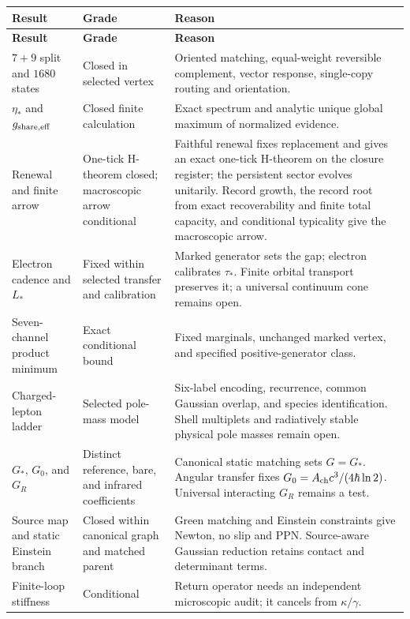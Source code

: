 \documentclass[11pt]{article}
\begin{document}
\begingroup
\setlength{\parskip}{0pt}
\small
\setlength{\tabcolsep}{4pt}
\renewcommand{\arraystretch}{1.13}
\begin{longtable}{L{0.24\textwidth}L{0.22\textwidth}L{0.47\textwidth}}
\toprule
\textbf{Result} & \textbf{Grade} & \textbf{Reason}\\
\midrule
\endfirsthead
\toprule
\textbf{Result} & \textbf{Grade} & \textbf{Reason}\\
\midrule
\endhead
\bottomrule
\endfoot
$7+9$ split and $1680$ states & Closed in selected vertex & Oriented matching, equal-weight reversible complement, vector response, single-copy routing and orientation.\\
$\eta_*$ and $g_{\rm share,eff}$ & Closed finite calculation & Exact spectrum and analytic unique global maximum of normalized evidence.\\
Renewal and finite arrow & One-tick H-theorem closed; macroscopic arrow conditional & Faithful renewal fixes replacement and gives an exact one-tick H-theorem on the closure register; the persistent sector evolves unitarily. Record growth, the record root from exact recoverability and finite total capacity, and conditional typicality give the macroscopic arrow.\\
Electron cadence and $L_*$ & Fixed within selected transfer and calibration & Marked generator sets the gap; electron calibrates $\tau_*$. Finite orbital transport preserves it; a universal continuum cone remains open.\\
Seven-channel product minimum & Exact conditional bound & Fixed marginals, unchanged marked vertex, and specified positive-generator class.\\
Charged-lepton ladder & Selected pole-mass model & Six-label encoding, recurrence, common Gaussian overlap, and species identification. Shell multiplets and radiatively stable physical pole masses remain open.\\
$G_*$, $G_0$, and $G_R$ & Distinct reference, bare, and infrared coefficients & Canonical static matching sets $G=G_*$. Angular transfer fixes $G_0=A_{\rm ch}c^3/(4\hbar\ln2)$. Universal interacting $G_R$ remains a test.\\
Source map and static Einstein branch & Closed within canonical graph and matched parent & Green matching and Einstein constraints give Newton, no slip and PPN. Source-aware Gaussian reduction retains contact and determinant terms.\\
Finite-loop stiffness & Conditional & Return operator needs an independent microscopic audit; it cancels from $\kappa/\gamma$.\\

\end{longtable}
\end{document}
